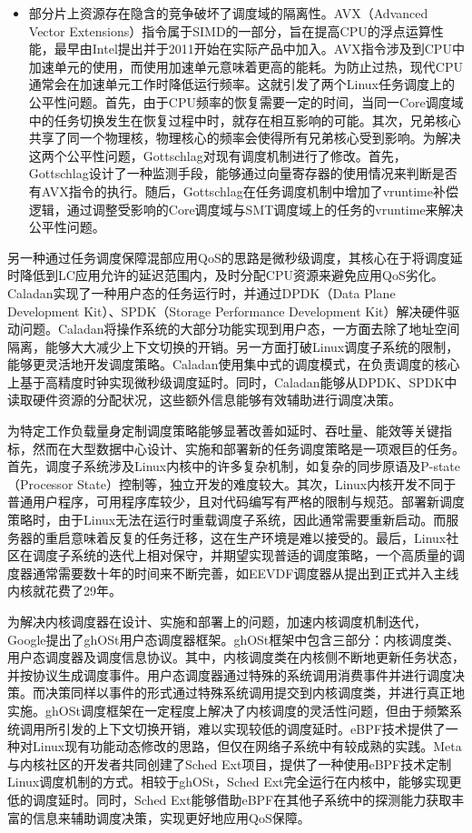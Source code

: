 \begin{itemize}
    \item 部分片上资源存在隐含的竞争破坏了调度域的隔离性。AVX（Advanced Vector Extensions）指令属于SIMD的一部分，旨在提高CPU的浮点运算性能，最早由Intel提出并于2011开始在实际产品中加入。AVX指令涉及到CPU中加速单元的使用，而使用加速单元意味着更高的能耗。为防止过热，现代CPU通常会在加速单元工作时降低运行频率。这就引发了两个Linux任务调度上的公平性问题。首先，由于CPU频率的恢复需要一定的时间，当同一Core调度域中的任务切换发生在恢复过程中时，就存在相互影响的可能。其次，兄弟核心共享了同一个物理核，物理核心的频率会使得所有兄弟核心受到影响。为解决这两个公平性问题，Gottschlag\citep{gottschlag2020avx}对现有调度机制进行了修改。首先，Gottschlag设计了一种监测手段，能够通过向量寄存器的使用情况来判断是否有AVX指令的执行。随后，Gottschlag在任务调度机制中增加了vruntime补偿逻辑，通过调整受影响的Core调度域与SMT调度域上的任务的vruntime来解决公平性问题。
\end{itemize}

另一种通过任务调度保障混部应用QoS的思路是微秒级调度\citep{ousterhout2019shenango,fried2020caladan,prekas2017zygos}，其核心在于将调度延时降低到LC应用允许的延迟范围内，及时分配CPU资源来避免应用QoS劣化。Caladan\citep{fried2020caladan}实现了一种用户态的任务运行时，并通过DPDK（Data Plane Development Kit）、SPDK（Storage Performance Development Kit）解决硬件驱动问题。Caladan将操作系统的大部分功能实现到用户态，一方面去除了地址空间隔离，能够大大减少上下文切换的开销。另一方面打破Linux调度子系统的限制，能够更灵活地开发调度策略。Caladan使用集中式的调度模式，在负责调度的核心上基于高精度时钟实现微秒级调度延时。同时，Caladan能够从DPDK、SPDK中读取硬件资源的分配状况，这些额外信息能够有效辅助进行调度决策。

为特定工作负载量身定制调度策略能够显著改善如延时、吞吐量、能效等关键指标，然而在大型数据中心设计、实施和部署新的任务调度策略是一项艰巨的任务\citep{humphries2021ghost}。首先，调度子系统涉及Linux内核中的许多复杂机制，如复杂的同步原语及P-state（Processor State）控制等，独立开发的难度较大。其次，Linux内核开发不同于普通用户程序，可用程序库较少，且对代码编写有严格的限制与规范。部署新调度策略时，由于Linux无法在运行时重载调度子系统，因此通常需要重新启动。而服务器的重启意味着反复的任务迁移，这在生产环境是难以接受的。最后，Linux社区在调度子系统的迭代上相对保守，并期望实现普适的调度策略，一个高质量的调度器通常需要数十年的时间来不断完善\citep{agache2020firecracker}，如EEVDF调度器从提出到正式并入主线内核就花费了29年。

为解决内核调度器在设计、实施和部署上的问题，加速内核调度机制迭代，Google提出了ghOSt\citep{humphries2021ghost}用户态调度器框架。ghOSt框架中包含三部分：内核调度类、用户态调度器及调度信息协议。其中，内核调度类在内核侧不断地更新任务状态，并按协议生成调度事件。用户态调度器通过特殊的系统调用消费事件并进行调度决策。而决策同样以事件的形式通过特殊系统调用提交到内核调度类，并进行真正地实施。ghOSt调度框架在一定程度上解决了内核调度的灵活性问题，但由于频繁系统调用所引发的上下文切换开销，难以实现较低的调度延时。eBPF技术提供了一种对Linux现有功能动态修改的思路，但仅在网络子系统中有较成熟的实践。Meta与内核社区的开发者共同创建了Sched Ext项目，提供了一种使用eBPF技术定制Linux调度机制的方式。相较于ghOSt，Sched Ext完全运行在内核中，能够实现更低的调度延时。同时，Sched Ext能够借助eBPF在其他子系统中的探测能力获取丰富的信息来辅助调度决策，实现更好地应用QoS保障。

